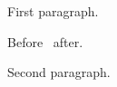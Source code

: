 \documentclass{article}
\begin{document}
First paragraph.

Before \lxmbf\ after.

Second paragraph.
\end{document}
